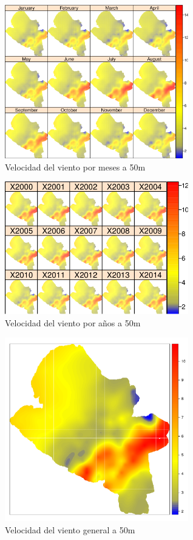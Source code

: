 \begin{figure}
  \centering
  \includegraphics[width = 8cm]{mapMonthsWind.pdf}
  \caption{Velocidad del viento por meses a 50m}
  \label{fig:meses}
\end{figure}

\begin{figure}
  \centering
  \includegraphics[width = 8cm]{mapYearsWind.pdf}
  \caption{Velocidad del viento por años a 50m}
  \label{fig:anios}
\end{figure}

\begin{figure}
  \centering
  \includegraphics[width = 8cm]{mapGeneralWind.pdf}
  \caption{Velocidad del viento general a 50m}
  \label{fig:total}
\end{figure}



